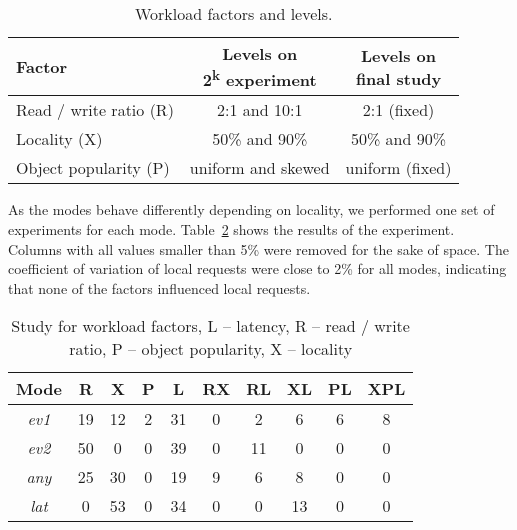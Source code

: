 \documentclass[man,floatsintext,12pt]{apa6}
\begin{document}
\begin{table}[h!]
\caption{Workload factors and levels.}
\label{tab:workload_factors_and_levels}
\begin{tabular}{lcc} \toprule
Factor & \thead{Levels on \\ 2\textsuperscript{k} experiment} & \thead{Levels on \\final study} \\ \midrule

Read / write ratio (R) & 2:1 and 10:1 & 2:1 (fixed)\\

Locality (X) & 50\% and 90\%  & 50\% and 90\% \\

Object popularity (P) & uniform and skewed & uniform (fixed) \\ \bottomrule

\end{tabular}
\end{table}

As the modes behave differently depending on locality, we performed one set of
experiments for each mode.
Table~\ref{tab:estudo_para_fatores_de_carga_de_trabalho} shows the results of
the experiment. Columns with all values smaller than 5\% were removed for the
sake of space. The coefficient of variation of local requests were close to 2\%
for all modes, indicating that none of the factors influenced local requests.

\begin{table}[h!]
\caption{Study for workload factors, L -- latency, R -- read / write ratio, P
-- object popularity, X -- locality}
\begin{tabular}{cccccccccc} \toprule

Mode & R & X & P & L & RX & RL & XL & PL & XPL\\ \midrule

\textit{ev1} & 19 & 12 & 2 & 31 & 0 & 2 & 6 & 6 & 8\\

\textit{ev2} & 50 & 0 & 0 & 39 & 0 & 11 & 0 & 0 & 0\\

\textit{any} & 25 & 30 & 0 & 19 & 9 & 6 & 8 & 0 & 0\\

\textit{lat} & 0 & 53 & 0 & 34 & 0 & 0 & 13 & 0 & 0\\ \bottomrule

\end{tabular}
\label{tab:estudo_para_fatores_de_carga_de_trabalho}
\end{table}
\end{document}
